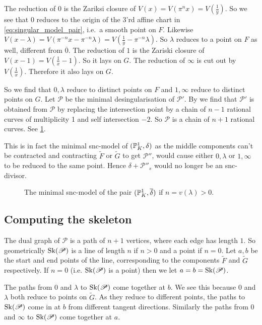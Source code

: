 The reduction of $0$ is the Zariksi closure of $V(x) = V(\pi ^{n} x ) = V(\frac{1}{y})$. 
So we see that $0$ reduces to the origin of the 3'rd affine chart in \eqref{eq:singular_model_pair}, i.e.\ a smooth point on $F$. 
Likewise  $V(x - \lambda) = V(\pi^{-n} x - \pi^{-n}\lambda) = V(\frac{1}{y} - \pi^{-n}\lambda)$. 
So $\lambda$ reduces to a point on $F$ as well, different from $\overline{0}$.
The reduction of $1$ is the Zariski closure of $V(x-1) = V(\frac{1}{x} - 1)$. 
So it lays on $G$. The reduction of $\infty$ is cut out by $V(\frac{1}{x})$. 
Therefore it also lays on $G$. 

So we find that $0, \lambda$ reduce to distinct points on $F$ and $1, \infty$ reduce to distinct points on $G$. 
Let $\mathscr P$ be the minimal desingularisation of $\mathscr P'$. 
By \cite[cor.\ 9.3.25]{liuAlgebraicGeometryArithmetic2002} we find that $\mathscr P'$ is obtained from $\mathscr P$ by replacing the intersection point by a chain of $n-1$ rational curves of multiplicity 1 and self intersection $-2$.  
So $\mathscr P$ is a chain of $n + 1$ rational curves. See \cref{fig:model_of_the_pair}. 

This is in fact the minimal snc-model of $(\mathbb{P}^{1}_K, \delta)$ as the middle components can't be contracted and contracting $\tilde F$ or $\tilde G$ to get $\mathscr P''$, would cause either $0, \lambda$ or $1, \infty$ to be reduced to the same point. Hence $\delta + \mathscr P''_s$ would no longer be an snc-divisor. 
\begin{figure}[h]
    \centering
    \caption{The minimal snc-model of the pair $(\mathbb{P}^{1}_K, \overline{\delta})$ if $n =v(\lambda) > 0$. }
    \label{fig:model_of_the_pair}
\end{figure}

\subsection{Computing the skeleton} \label{sec:computing_the_skeleton}

The dual graph of $\mathscr P$ is a path of $n + 1$ vertices, where each edge has length $1$. 
So geometrically $\operatorname{Sk}(\mathscr P)$ is a line of length $n$ if $n > 0$ and a point if $n = 0$.
Let $a, b$ be the start and end points of the line, corresponding to the components $\tilde F$ and $\tilde G$ respectively. If $n = 0$ (i.e. $\operatorname{Sk}(\mathscr P)$ is a point) then we let $a = b = \operatorname{Sk}(\mathscr P)$. 

The paths from $0$ and  $\lambda$ to $\operatorname{Sk}(\mathscr P)$ come together at $b$. We see this because $0$ and $\lambda$ both reduce to points on $\tilde G$. 
As they reduce to different points, the paths to $\operatorname{Sk}(\mathscr P)$ come in at $b$ from different tangent directions. 
Similarly the paths from $0$ and $\infty$ to $\operatorname{Sk}(\mathscr P)$ come together at $a$.


